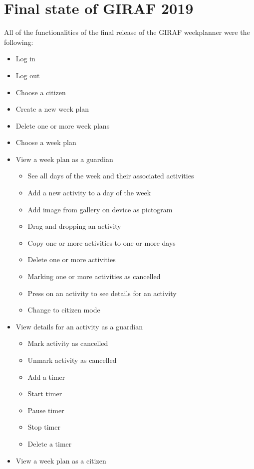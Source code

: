 \chapter{Final state of GIRAF 2019}\label{appendix:finals-state-of-giraf-2019}
All of the functionalities of the final release of the GIRAF weekplanner were the following:
\begin{itemize}
    \item Log in
    \item Log out
    \item Choose a citizen
    \item Create a new week plan
    \item Delete one or more week plans
    \item Choose a week plan
    \item View a week plan as a guardian
    \begin{itemize}
        \item See all days of the week and their associated activities
        \item Add a new activity to a day of the week
        \item Add image from gallery on device as pictogram
        \item Drag and dropping an activity
        \item Copy one or more activities to one or more days
        \item Delete one or more activities
        \item Marking one or more activities as cancelled
        \item Press on an activity to see details for an activity
        \item Change to citizen mode
    \end{itemize}
    \item View details for an activity as a guardian
    \begin{itemize}
        \item Mark activity as cancelled
        \item Unmark activity as cancelled
        \item Add a timer
        \item Start timer
        \item Pause timer
        \item Stop timer
        \item Delete a timer
    \end{itemize}
    \item View a week plan as a citizen

\end{itemize}
